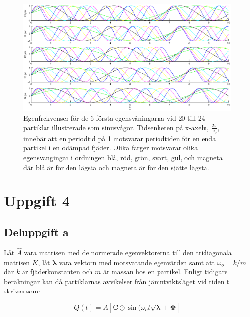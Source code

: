 \documentclass[12pt,a4paper]{article}
\begin{document}
		
		\begin{figure}
			\hspace{-1.5cm}\includegraphics[width=1.2\textwidth]{egenfrekvenser.eps}
			\caption{Egenfrekvenser för de 6 första egensväningarna vid 20 till 24 partiklar
			illustrerade som sinusvågor. Tidsenheten på x-axeln, $\frac{2\pi}{\omega_o}$,
			innebär att en periodtid på 1 motsvarar periodtiden för en enda partikel i en
			odämpad fjäder. Olika färger motsvarar olika egensvängingar i ordningen blå, röd,
			grön, svart, gul, och magneta där blå är för den lägsta och magneta är för den sjätte lägsta.}
			\label{egenf}
		\end{figure}
		
		\clearpage
		
\section{Uppgift 4}
	
	\setcounter{equation}{0}
	
	\subsection{Deluppgift a}
		
		Låt $\hat{A}$ vara matrisen med de normerade egenvektorerna till den tridiagonala
		matrisen $K$, låt $\boldsymbol{\lambda}$ vara vektorn med motsvarande egenvärden samt att
		$\omega_o = k / m$ där $k$ är fjäderkonstanten och $m$ är massan hos en partikel.
		Enligt tidigare beräkningar kan då partiklarnas avvikelser från jämntviktsläget vid
		tiden t skrivas som:
		
		\begin{equation*}
			Q(t) = A \left[ \mathbf{C} \odot \sin(\omega_o t \sqrt{\boldsymbol{\lambda}} + \mathbf{\Phi} \right]
		\end{equation*}
		
\end{document}

